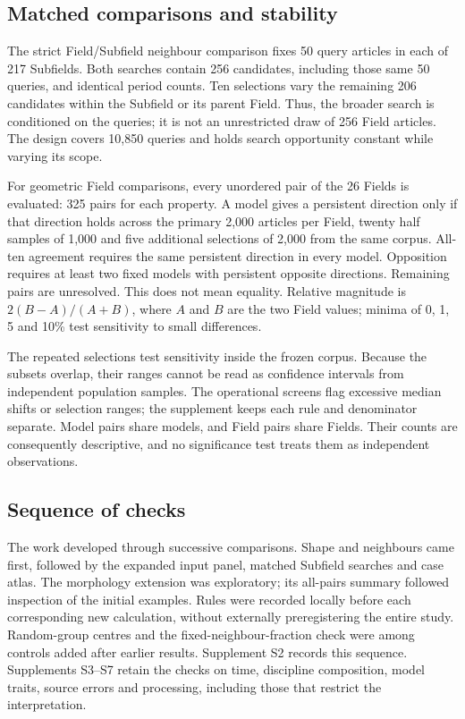 \documentclass[12pt]{article}
\begin{document}
\subsection{Matched comparisons and stability}
The strict Field/Subfield neighbour comparison fixes 50 query articles in each of 217 Subfields. Both searches contain 256 candidates, including those same 50 queries, and identical period counts. Ten selections vary the remaining 206 candidates within the Subfield or its parent Field. Thus, the broader search is conditioned on the queries; it is not an unrestricted draw of 256 Field articles. The design covers 10,850 queries and holds search opportunity constant while varying its scope.

For geometric Field comparisons, every unordered pair of the 26 Fields is evaluated: 325 pairs for each property. A model gives a persistent direction only if that direction holds across the primary 2,000 articles per Field, twenty half samples of 1,000 and five additional selections of 2,000 from the same corpus. All-ten agreement requires the same persistent direction in every model. Opposition requires at least two fixed models with persistent opposite directions. Remaining pairs are unresolved. This does not mean equality. Relative magnitude is $2(B-A)/(A+B)$, where $A$ and $B$ are the two Field values; minima of 0, 1, 5 and 10\% test sensitivity to small differences.

The repeated selections test sensitivity inside the frozen corpus. Because the subsets overlap, their ranges cannot be read as confidence intervals from independent population samples. The operational screens flag excessive median shifts or selection ranges; the supplement keeps each rule and denominator separate. Model pairs share models, and Field pairs share Fields. Their counts are consequently descriptive, and no significance test treats them as independent observations.

\subsection{Sequence of checks}
The work developed through successive comparisons. Shape and neighbours came first, followed by the expanded input panel, matched Subfield searches and case atlas. The morphology extension was exploratory; its all-pairs summary followed inspection of the initial examples. Rules were recorded locally before each corresponding new calculation, without externally preregistering the entire study. Random-group centres and the fixed-neighbour-fraction check were among controls added after earlier results. Supplement S2 records this sequence. Supplements S3--S7 retain the checks on time, discipline composition, model traits, source errors and processing, including those that restrict the interpretation.
\end{document}
